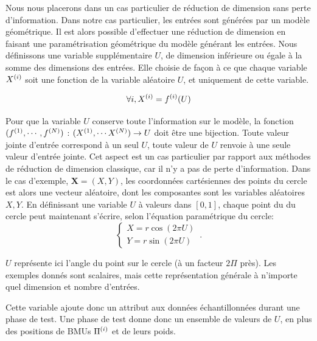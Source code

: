 Nous nous placerons dans un cas particulier de réduction de dimension sans perte d'information.
Dans notre cas particulier, les entrées sont générées par un modèle géométrique. Il est alors possible d'effectuer une réduction de dimension en faisant une paramétrisation géométrique du modèle générant les entrées.
Nous définissons une variable supplémentaire $U$, de dimension inférieure ou égale à la somme des dimensions des entrées.
Elle choisie de façon à ce que chaque variable $X^{({i})}$ soit une fonction de la variable aléatoire $U$, et uniquement de cette variable.

\begin{equation}
\forall i, X^{({i})} = f^{({i})}(U)
\label{eq:U}
\end{equation}

Pour que la variable $U$ conserve toute l'information sur le modèle, la fonction $(f^{({1})}, \cdots, f^{({N})})$ : $(X^{({1})}, \cdots X^{({N})})\rightarrow U$ doit être une bijection. Toute valeur jointe d'entrée correspond à un seul $U$, toute valeur de $U$ renvoie à une seule valeur d'entrée jointe. 
Cet aspect est un cas particulier par rapport aux méthodes de réduction de dimension classique, car il n'y a pas de perte d'information.
Dans le cas d'exemple, $\mathbf{X} = (X,Y)$, les coordonnées cartésiennes des points du cercle est alors une vecteur aléatoire, dont les composantes sont les variables aléatoires $X,Y$. En définissant une variable $U$ à valeurs dans $[0,1]$, chaque point du du cercle peut maintenant s'écrire, selon l'équation paramétrique du cercle:
\begin{equation}
 \begin{cases}
     X = r  \cos(2\pi U)\\
     Y = r \sin(2 \pi U)
    \end{cases}\,.
\end{equation}

$U$ représente ici l'angle du point sur le cercle (à un facteur $2\Pi$ près). Les exemples donnés sont scalaires, mais cette représentation générale à n'importe quel dimension et nombre d'entrées.

Cette variable ajoute donc un attribut aux données échantillonnées durant une phase de test. Une phase de test donne donc un ensemble de valeurs de $U$, en plus des positions de BMUs $\Pi^{({i})}$ et de leurs poids.

